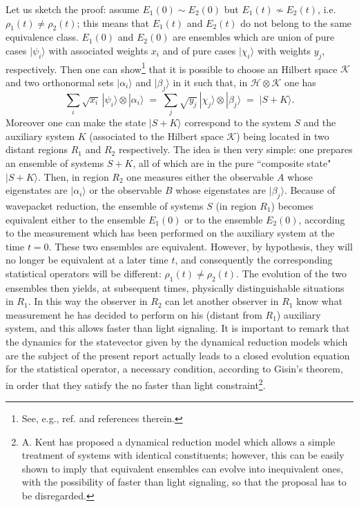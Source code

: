 \documentclass[12pt]{article}
\begin{document}
Let us sketch the proof: assume $E_{1}(0) \sim E_{2}(0)$ but
$E_{1}(t) \not\sim E_{2}(t)$, i.e. $\rho_{1}(t) \neq \rho_{2}(t)$;
this means that $E_{1}(t)$ and $E_{2}(t)$ do not belong to the
same equivalence class. $E_{1}(0)$ and $E_{2}(0)$ are ensembles
which are union of pure cases $|\psi_{i}\rangle$ with associated
weights $x_{i}$ and of pure cases $|\chi_{i}\rangle$ with weights
$y_{j}$, respectively. Then one can show\footnote{See, e.g.,
ref.\cite{qph} and references therein.} that it is possible to choose an
Hilbert space
${\mathcal K}$ and two orthonormal sets
$|\alpha_{i}\rangle$ and $|\beta_{j}\rangle$ in it such that, in
${\mathcal H} \otimes {\mathcal K}$ one has
\begin{equation}
\sum_{i} \sqrt{x_{i}}\,|\psi_{i}\rangle\otimes|\alpha_{i}\rangle
\; = \; \sum_{j}
\sqrt{y_{j}}\,|\chi_{j}\rangle\otimes|\beta_{j}\rangle \; = \;
|S+K\rangle.
\end{equation}
Moreover one can make the state $|S+K\rangle$ correspond to the
system $S$ and the auxiliary system $K$ (associated to the Hilbert
space ${\mathcal K}$) being located in two distant regions $R_{1}$
and $R_{2}$ respectively. The idea is then very simple: one
prepares an ensemble of systems $S+K$, all of which are in the
pure ``composite state" $|S+K\rangle$. Then, in region $R_{2}$ one
measures either the observable $A$ whose eigenstates are
$|\alpha_{i}\rangle$ or the observable $B$ whose eigenstates are
$|\beta_{j}\rangle$. Because of wavepacket reduction, the ensemble
of systems $S$ (in region $R_{1}$) becomes equivalent either to
the ensemble $E_{1}(0)$ or to the ensemble $E_{2}(0)$, according
to the measurement which has been performed on the auxiliary
system at the time $t=0$. These two ensembles are equivalent.
However, by hypothesis, they will no longer  be  equivalent at a
later time $t$, and  consequently the corresponding statistical
operators will be different: $\rho_{1}(t) \neq \rho_{2}(t)$. The
evolution of the two ensembles then yields, at subsequent times,
physically distinguishable situations in $R_{1}$. In this way the
observer in $R_{2}$ can let another observer in $R_{1}$ know what
measurement he has decided to perform on his (distant from
$R_{1}$) auxiliary system, and this allows faster than light
signaling. It is important to remark that the dynamics for the
statevector given by the dynamical reduction models which are the
subject of the present report actually leads to a closed evolution
equation for the statistical operator, a necessary condition,
according to Gisin's theorem, in order that they satisfy the no
faster than light constraint\footnote{A. Kent \cite{kenfl} has
proposed a dynamical reduction model which allows a simple
treatment of systems with identical constituents; however, this
can be easily shown to imply that equivalent ensembles can evolve
into inequivalent ones, with the possibility of faster than light
signaling, so that the proposal has to be disregarded.}.
\end{document}

